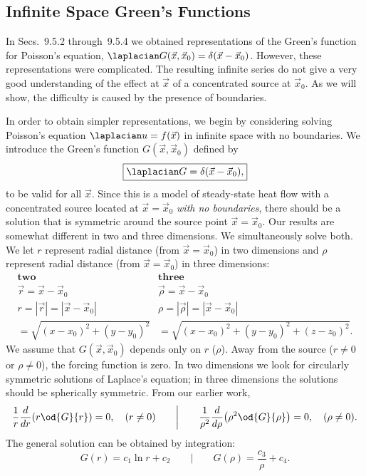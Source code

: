 \subsection{Infinite Space Green's Functions}
\label{sec:greens-infinite-space}

In Secs.~9.5.2 through~9.5.4 we obtained representations of the Green's function for Poisson's equation, $\laplacian G(\vec{x},\vec{x}_0) = \delta(\vec{x}-\vec{x}_0)$.  However, these representations were complicated.  The resulting infinite series do not give a very good understanding of the effect at $\vec{x}$ of a concentrated source at $\vec{x}_0$.  As we will show, the difficulty is caused by the presence of boundaries.

In order to obtain simpler representations, we begin by considering solving Poisson's equation $\laplacian u = f(\vec{x})$ in infinite space with no boundaries.  We introduce the Green's function $G(\vec{x},\vec{x}_0)$ defined by
\begin{equation}
\label{eq:9.5.27}
\boxed{\laplacian G = \delta(\vec{x}-\vec{x}_0),}
\end{equation}
to be valid for all $\vec{x}$.  Since this is a model of steady-state heat flow with a concentrated source located at $\vec{x} = \vec{x}_0$ \emph{with no boundaries}, there should be a solution that is symmetric around the source point $\vec{x} = \vec{x}_0$.  Our results are somewhat different in two and three dimensions.  We simultaneously solve both.  We let $r$ represent radial distance (from $\vec{x} = \vec{x}_0$) in two dimensions and $\rho$ represent radial distance (from $\vec{x} = \vec{x}_0$) in three dimensions:
\begin{equation}
\label{eq:9.5.28}
\begin{array}{ll}
\textbf{two} & \textbf{three} \\
\vec{r} = \vec{x} - \vec{x}_0 & \vec{\rho} = \vec{x} - \vec{x}_0 \\
r = |\vec{r}| = |\vec{x}-\vec{x}_0| & \rho = |\vec{\rho}| = |\vec{x}-\vec{x}_0| \\
= \sqrt{(x-x_0)^2+(y-y_0)^2} & = \sqrt{(x-x_0)^2+(y-y_0)^2+(z-z_0)^2}.
\end{array}
\end{equation}
We assume that $G(\vec{x},\vec{x}_0)$ depends only on $r$ ($\rho$).  Away from the source ($r \neq 0$ or $\rho \neq 0$), the forcing function is zero.  In two dimensions we look for circularly symmetric solutions of Laplace's equation; in three dimensions the solutions should be spherically symmetric.  From our earlier work,
\[
\frac{1}{r}\frac{d}{d r}\!\left(r\od{G}{r}\right) = 0, \quad (r\neq 0) \qquad\bigg|\qquad \frac{1}{\rho^2}\frac{d}{d \rho}\!\left(\rho^2\od{G}{\rho}\right) = 0, \quad (\rho\neq 0).
\]
The general solution can be obtained by integration:
\begin{equation}
\label{eq:9.5.29}
G(r) = c_1\ln r + c_2 \qquad\bigg|\qquad G(\rho) = \frac{c_3}{\rho} + c_4.
\end{equation}

